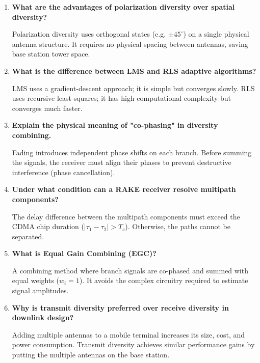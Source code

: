 \documentclass[12pt,a4paper]{article}
\newcommand{\Q}[1]{\textbf{#1}\par\noindent\ignorespaces}
\begin{document}
\begin{tcolorbox}[exambox, title={\textbf{Frequently Asked / Viva Questions}}]
\begin{enumerate}[topsep=0pt, label=\textbf{Q\arabic*.}, itemsep=5pt]
    To ensure uncorrelated fading, the spacing should be at least $0.5\lambda$ at the mobile terminal (due to rich local scattering) and $10\lambda$ to $20\lambda$ at the base station (due to high elevation and narrow angle of arrival).
  \item \Q{What are the advantages of polarization diversity over spatial diversity?}
    Polarization diversity uses orthogonal states (e.g. $\pm 45^\circ$) on a single physical antenna structure. It requires no physical spacing between antennas, saving base station tower space.
  \item \Q{What is the difference between LMS and RLS adaptive algorithms?}
    LMS uses a gradient-descent approach; it is simple but converges slowly. RLS uses recursive least-squares; it has high computational complexity but converges much faster.
  \item \Q{Explain the physical meaning of "co-phasing" in diversity combining.}
    Fading introduces independent phase shifts on each branch. Before summing the signals, the receiver must align their phases to prevent destructive interference (phase cancellation).
  \item \Q{Under what condition can a RAKE receiver resolve multipath components?}
    The delay difference between the multipath components must exceed the CDMA chip duration ($|\tau_1 - \tau_2| > T_c$). Otherwise, the paths cannot be separated.
  \item \Q{What is Equal Gain Combining (EGC)?}
    A combining method where branch signals are co-phased and summed with equal weights ($w_i=1$). It avoids the complex circuitry required to estimate signal amplitudes.
  \item \Q{Why is transmit diversity preferred over receive diversity in downlink design?}
    Adding multiple antennas to a mobile terminal increases its size, cost, and power consumption. Transmit diversity achieves similar performance gains by putting the multiple antennas on the base station.
\end{enumerate}
\end{tcolorbox}
\end{document}
